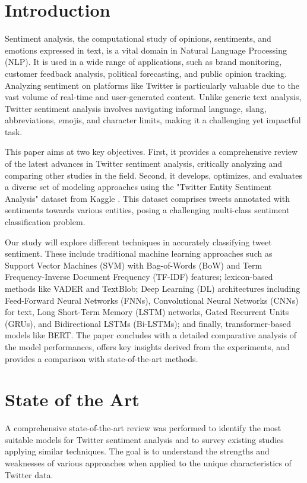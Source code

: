 \section{Introduction}
\label{sec:Introduction}
Sentiment analysis, the computational study of opinions, sentiments, and emotions expressed in text, is a vital domain in Natural Language Processing (NLP). It is used in a wide range of applications, such as brand monitoring, customer feedback analysis, political forecasting, and public opinion tracking. Analyzing sentiment on platforms like Twitter is particularly valuable due to the vast volume of real-time and user-generated content. Unlike generic text analysis, Twitter sentiment analysis involves navigating informal language, slang, abbreviations, emojis, and character limits, making it a challenging yet impactful task.

This paper aims at two key objectives. First, it provides a comprehensive review of the latest advances in Twitter sentiment analysis, critically analyzing and comparing other studies in the field. Second, it develops, optimizes, and evaluates a diverse set of modeling approaches using the "Twitter Entity Sentiment Analysis" dataset from Kaggle \cite{twitter_dataset}. This dataset comprises tweets annotated with sentiments towards various entities, posing a challenging multi-class sentiment classification problem.

Our study will explore different techniques in accurately classifying tweet sentiment. These include traditional machine learning approaches such as Support Vector Machines (SVM) with Bag-of-Words (BoW) and Term Frequency-Inverse Document Frequency (TF-IDF) features; lexicon-based methods like VADER and TextBlob; Deep Learning (DL) architectures including Feed-Forward Neural Networks (FNNs), Convolutional Neural Networks (CNNs) for text, Long Short-Term Memory (LSTM) networks, Gated Recurrent Units (GRUs), and Bidirectional LSTMs (Bi-LSTMs); and finally, transformer-based models like BERT. The paper concludes with a detailed comparative analysis of the model performances, offers key insights derived from the experiments, and provides a comparison with state-of-the-art methods.

\section{State of the Art} 
\label{sec}

A comprehensive state-of-the-art review was performed to identify the most suitable models for Twitter sentiment analysis and to survey existing studies applying similar techniques. The goal is to understand the strengths and weaknesses of various approaches when applied to the unique characteristics of Twitter data.

